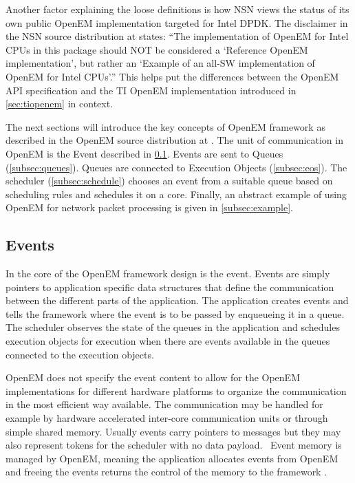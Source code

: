 Another factor explaining the loose definitions is how NSN views the status of its own public OpenEM implementation targeted for Intel DPDK. The disclaimer in the NSN source distribution at \cite{openempage} states: ``The implementation of OpenEM for Intel CPUs in this package should NOT be considered a `Reference OpenEM implementation', but rather an `Example of an all-SW implementation of OpenEM for Intel CPUs'.'' This helps put the differences between the OpenEM API specification and the TI OpenEM implementation introduced in \ref{sec:tiopenem} in context.

The next sections will introduce the key concepts of OpenEM framework as described in the OpenEM source distribution at \cite{openempage}. The unit of communication in OpenEM is the Event described in \ref{subsec:event}. Events are sent to Queues (\ref{subsec:queues}). Queues are connected to Execution Objects (\ref{subsec:eos}). The scheduler (\ref{subsec:schedule}) chooses an event from a suitable queue based on scheduling rules and schedules it on a core. Finally, an abstract example of using OpenEM for network packet processing is given in \ref{subsec:example}.

\subsection{Events}
\label{subsec:event}
In the core of the OpenEM framework design is the event. Events are simply pointers to application specific data structures that define the communication between the different parts of the application. The application creates events and tells the framework where the event is to be passed by enqueueing it in a queue. The scheduler observes the state of the queues in the application and schedules execution objects for execution when there are events available in the queues connected to the execution objects.~\cite{openemintro}

OpenEM does not specify the event content to allow for the OpenEM implementations for different hardware platforms to organize the communication in the most efficient way available. The communication may be handled for example by hardware accelerated inter-core communication units or through simple shared memory. Usually events carry pointers to messages but they may also represent tokens for the scheduler with no data payload.~\cite{openemintro} Event memory is managed by OpenEM, meaning the application allocates events from OpenEM and freeing the events returns the control of the memory to the framework \cite{openemintro}.


